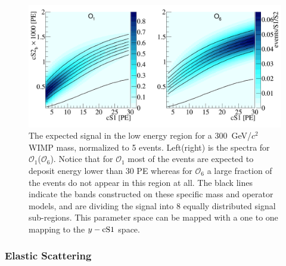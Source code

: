 \begin{figure}[h!]
\begin{minipage}{1.\linewidth}
\centerline{\includegraphics[width=1.\linewidth]{Figures/SigLowO1O6.png}}
\end{minipage}
\caption{The expected signal in the low energy region for a 300~GeV/$c^2$ WIMP mass, normalized to 5 events. Left(right) is the spectra for $\mathcal{O}_1$($\mathcal{O}_6$). Notice that for $\mathcal{O}_1$ most of the events are expected to deposit energy lower than 30 PE whereas for $\mathcal{O}_6$ a large fraction of the events do not appear in this region at all. The black lines indicate the bands constructed on these specific mass and operator models, and are dividing the signal into 8 equally distributed signal sub-regions. This parameter space can be mapped with a one to one mapping to the $y-\mathrm{cS1}$ space.}
\label{fig:LowE}
\end{figure}




%

\subsubsection{Elastic Scattering}
\label{subsubsec:Elastic}

